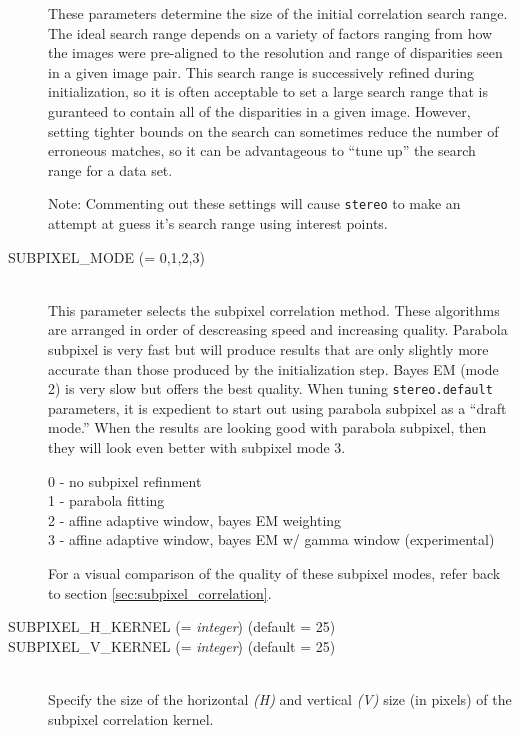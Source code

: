 \begin{description}
  These parameters determine the size of the initial correlation
  search range.  The ideal search range depends on a variety of
  factors ranging from how the images were pre-aligned to the
  resolution and range of disparities seen in a given image pair.
  This search range is successively refined during initialization, so
  it is often acceptable to set a large search range that is guranteed
  to contain all of the disparities in a given image.  However,
  setting tighter bounds on the search can sometimes reduce the number
  of erroneous matches, so it can be advantageous to ``tune up'' the
  search range for a data set.

  Note: Commenting out these settings will cause {\tt stereo} to make an
  attempt at guess it's search range using interest points.

\item[SUBPIXEL\_MODE \textnormal{\small{(= 0,1,2,3)}}] \hfill \\

  This parameter selects the subpixel correlation method. These
  algorithms are arranged in order of descreasing speed and increasing
  quality. Parabola subpixel is very fast but will produce results
  that are only slightly more accurate than those produced by the
  initialization step. Bayes EM (mode 2) is very slow but offers the
  best quality. When tuning {\tt stereo.default} parameters, it is
  expedient to start out using parabola subpixel as a ``draft mode.''
  When the results are looking good with parabola subpixel, then they
  will look even better with subpixel mode 3.

  \begin{description}
    \item[0 - no subpixel refinment]
    \item[1 - parabola fitting ]
    \item[2 - affine adaptive window, bayes EM weighting ]
    \item[3 - affine adaptive window, bayes EM w/ gamma window (experimental) ]
  \end{description}

  For a visual comparison of the quality of these subpixel modes,
  refer back to section \ref{sec:subpixel_correlation}.

\item[SUBPIXEL\_H\_KERNEL \textnormal{\small{(= \emph{integer})}} (default = 25)]
\item[SUBPIXEL\_V\_KERNEL \textnormal{\small{(= \emph{integer})}} (default = 25)] \hfill \\

  Specify the size of the horizontal \emph{(H)} and vertical
  \emph{(V)} size (in pixels) of the subpixel correlation kernel.

\end{description}

